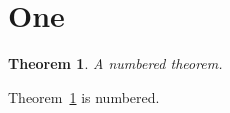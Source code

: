 \documentclass{article}
\newtheorem{theorem}{Theorem}
\begin{document}
\section{One}
\begin{theorem}\label{thm:one}A numbered theorem.\end{theorem}
Theorem~\ref{thm:one} is numbered.
\end{document}
